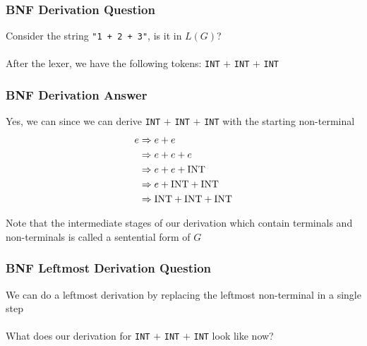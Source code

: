 \documentclass[aspectratio=169]{beamer}
\begin{document}
\begin{frame}
\frametitle{BNF Derivation Question}

Consider the string \lstinline{"1 + 2 + 3"}, is it in $L(G)$?\\~\\

After the lexer, we have the following tokens: \lstinline{INT} $+$
\lstinline{INT} $+$ \lstinline{INT}
\end{frame}

\begin{frame}
\frametitle{BNF Derivation Answer}

Yes, we can since we can derive \lstinline{INT} $+$ \lstinline{INT} $+$
\lstinline{INT} with the \alert{starting non-terminal}
\begin{align*}
e &\Rightarrow e + e\\
  &\Rightarrow e + e + e\\
  &\Rightarrow e + e + \text{\lstinline{INT}}\\
  &\Rightarrow e + \text{\lstinline{INT}} + \text{\lstinline{INT}}\\
  &\Rightarrow \text{\lstinline{INT}} + \text{\lstinline{INT}} +
               \text{\lstinline{INT}}
\end{align*}

Note that the intermediate stages of our derivation which contain terminals and
non-terminals is called a \alert{sentential form} of $G$
\end{frame}

\begin{frame}
\frametitle{BNF Leftmost Derivation Question}

We can do a \alert{leftmost derivation} by replacing the leftmost non-terminal
in a single step\\~\\

What does our derivation for  \lstinline{INT} $+$ \lstinline{INT} $+$
\lstinline{INT} look like now?
\end{frame}
\end{document}
